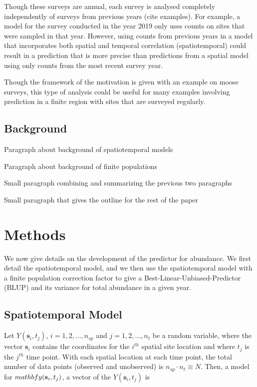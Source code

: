 \documentclass[]{interact}
\theoremstyle{plain}%
\theoremstyle{definition}
\theoremstyle{remark}
\begin{document}
Though these surveys are annual, each survey is analysed completely
independently of surveys from previous years (cite examples). For
example, a model for the survey conducted in the year 2019 only uses
counts on sites that were sampled in that year. However, using counts
from previous years in a model that incorporates both spatial and
temporal correlation (spatiotemporal) could result in a prediction that
is more precise than predictions from a spatial model using only counts
from the most recent survey year.

Though the framework of the motivation is given with an example on moose
surveys, this type of analysis could be useful for many examples
involving prediction in a finite region with sites that are surveyed
regularly.

\subsection{Background}

Paragraph about background of spatiotemporal models

Paragraph about background of finite populations

Small paragraph combining and summarizing the previous two paragraphs

Small paragraph that gives the outline for the rest of the paper

\section{Methods}

We now give details on the development of the predictor for abundance.
We first detail the spatiotemporal model, and we then use the
spatiotemporal model with a finite population correction factor to give
a Best-Linear-Unbiased-Predictor (BLUP) and its variance for total
abundance in a given year.

\subsection{Spatiotemporal Model}

Let \(Y(\mathbf{s}_{i}, t_j)\), \(i = 1, 2, \ldots, n_{sp}\) and
\(j = 1, 2, \ldots, n_{t}\) be a random variable, where the vector
\(\mathbf{s}_i\) contains the coordinates for the \(i^{th}\) spatial
site location and where \(t_j\) is the \(j^{th}\) time point. With each
spatial location at each time point, the total number of data points
(observed and unobserved) is \(n_{sp} \cdot n_{t} \equiv N\). Then, a
model for \(\\mathbf{y}(\mathbf{s}_{i}, t_j)\), a vector of the
\(Y(\mathbf{s}_{i}, t_j)\) is
\end{document}
